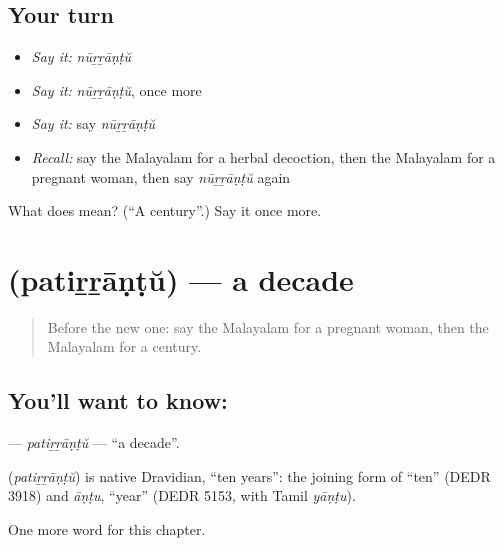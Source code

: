 \subsection*{Your turn}
\begin{itemize}
\raggedright
  \item \emph{Say it:} \emph{nūṟṟāṇṭŭ}
  \item \emph{Say it:} \emph{nūṟṟāṇṭŭ}, once more
  \item \emph{Say it:} say \emph{nūṟṟāṇṭŭ}
  \item \emph{Recall:} say the Malayalam for a herbal decoction, then the Malayalam for a pregnant woman, then say \emph{nūṟṟāṇṭŭ} again
\end{itemize}

\begin{tcolorbox}[breakable,colback=teal!4,colframe=teal!35!black,title={Before you move on}]
What does  mean? (\textquotedblleft{}A century\textquotedblright{}.) Say it once more.
\end{tcolorbox}
\section[\texorpdfstring{\ml{പതിറ്റാണ്ട്} (patiṟṟāṇṭŭ)}{പതിറ്റാണ്ട് (patiṟṟāṇṭŭ)}]{ (patiṟṟāṇṭŭ) — a decade}

\label{lesson:ML-C314-patirrantu}



\begin{quote}
Before the new one: say the Malayalam for a pregnant woman, then the Malayalam for a century.
\end{quote}

\subsection*{You'll want to know: }
\textbf{} — \emph{patiṟṟāṇṭŭ} — \textquotedblleft{}a decade\textquotedblright{}.

\begin{cousinweb}
\textbf{} (\emph{patiṟṟāṇṭŭ}) is native Dravidian, \textquotedblleft{}ten years\textquotedblright{}: the joining form of \textquotedblleft{}ten\textquotedblright{} (DEDR 3918) and \emph{āṇṭu}, \textquotedblleft{}year\textquotedblright{} (DEDR 5153, with Tamil \emph{yāṇṭu}).
\end{cousinweb}

\begin{grammarlens}[title={What you've built}]
One more word for this chapter.
\end{grammarlens}

